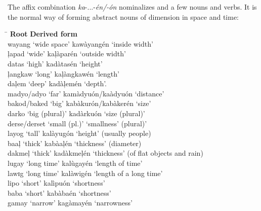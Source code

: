 The affix combination \textit{ka}{}-...-\textit{én/-ón} nominalizes  and a few nouns and verbs. It is the normal way of forming abstract nouns of dimension in space and time:
\ea
\label{bkm:Ref503507725}
\begin{tabbing}
\hspace{3.8cm} \= \kill
\textbf{Root} \> \textbf{Derived form} \\
wayang ‘wide space’ \> kawàyangén ‘inside width’ \\
ļapad ‘wide’ \> kaļàparén ‘outside width’ \\
datas ‘high’ \> kadàtasén ‘height’ \\
ļangkaw ‘long’ \> kaļàngkawén ‘length’ \\
daļem ‘deep’ \> kadàļemén ‘depth’. \\
madyo/adyo ‘far’ \> kamàdyuón/kaàdyuón ‘distance’ \\
bakod/baked ‘big’ \> kabàkurón/kabàkerén ‘size’ \\
darko ‘big (plural)’ \> kadàrkuón ‘size (plural)’ \\
derse/derset ‘small (pl.)’ \> `smallness' (plural)’ \\
layog ‘tall’ \> kalàyugón ‘height’ (usually people) \\
baaļ ‘thick’ \> kabàaļén ‘thickness’ (diameter) \\
dakmeļ ‘thick’ \> kadàkmeļén ‘thickness’ (of flat objects and rain) \\
lugay ‘long time’ \> kalùgayén ‘length of time’ \\
lawɪg ‘long time’ \> kalàwigén ‘length of a long time’ \\
lipo `short' \> kalìpuón `shortness' \\
baba `short' \> kabàbaén `shortness' \\
gamay `narrow' \> kagàmayén `narrowness'
\end{tabbing}
\z

